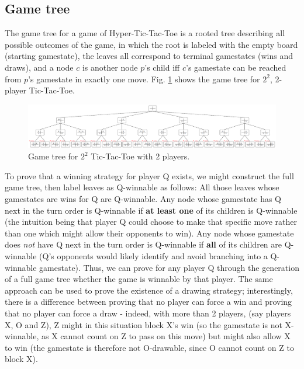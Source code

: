 \documentclass[12pt,a4paper]{article}
\begin{document}
\subsection*{Game tree}
The game tree for a game of Hyper-Tic-Tac-Toe is a rooted tree describing all possible outcomes of the game, in which the root is labeled with the empty board (starting gamestate), the leaves all correspond to terminal gamestates (wins and draws), and a node $c$ is another node $p$'s child iff $c$'s gamestate can be reached from $p$'s gamestate in exactly one move. Fig. \ref{fig:fulltree} shows the game tree for $2^2$, 2-player Tic-Tac-Toe. 
\begin{figure}[!h]
	\centering
	\includegraphics[scale=.65]{./img/fulltree.png}
	\caption{Game tree for $2^2$ Tic-Tac-Toe with 2 players.} \label{fig:fulltree}
\end{figure}
To prove that a winning strategy for player Q exists, we might construct the full game tree, then label leaves as Q-winnable as follows:
All those leaves whose gamestates are wins for Q are Q-winnable. 
Any node whose gamestate has Q next in the turn order is Q-winnable if \textbf{at least one} of its children is Q-winnable (the intuition being that player Q could choose to make that specific move rather than one which might allow their opponents to win).
Any node whose gamestate does \textit{not} have Q next in the turn order is Q-winnable if \textbf{all} of its children are Q-winnable (Q's opponents would likely identify and avoid branching into a Q-winnable gamestate). 
Thus, we can prove for any player Q through the generation of a full game tree whether the game is winnable by that player.
The same approach can be used to prove the existence of a drawing strategy; interestingly, there is a difference between proving that no player can force a win and proving that no player can force a draw - indeed, with more than 2 players, (say players X, O and Z), Z might in this situation block X's win (so the gamestate is not X-winnable, as X cannot count on Z to pass on this move) but might also allow X to win (the gamestate is therefore not O-drawable, since O cannot count on Z to block X).  
\end{document}
